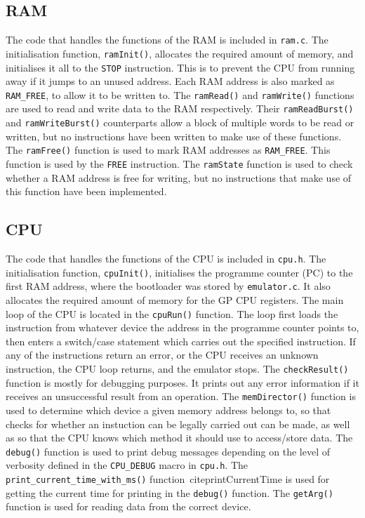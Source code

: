 \documentclass[a4paper,11pt]{article}
\begin{document}
    \subsection{RAM}
        The code that handles the functions of the RAM is included in \lstinline{ram.c}. The initialisation function, \lstinline{ramInit()}, allocates the required amount of memory, and initialises it all to the \lstinline{STOP} instruction. This is to prevent the CPU from running away if it jumps to an unused address. Each RAM address is also marked as \lstinline{RAM_FREE}, to allow it to be written to. The \lstinline{ramRead()} and \lstinline{ramWrite()} functions are used to read and write data to the RAM respectively. Their \lstinline{ramReadBurst()} and \lstinline{ramWriteBurst()} counterparts allow a block of multiple words to be read or written, but no instructions have been written to make use of these functions. The \lstinline{ramFree()} function is used to mark RAM addresses as \lstinline{RAM_FREE}. This function is used by the \lstinline{FREE} instruction. The \lstinline{ramState} function is used to check whether a RAM address is free for writing, but no instructions that make use of this function have been implemented.
    
    \subsection{CPU}
        The code that handles the functions of the CPU is included in \lstinline{cpu.h}. The initialisation function, \lstinline{cpuInit()}, initialises the programme counter (PC) to the first RAM address, where the bootloader was stored by \lstinline{emulator.c}. It also allocates the required amount of memory for the GP CPU registers. The main loop of the CPU is located in the \lstinline{cpuRun()} function. The loop first loads the instruction from whatever device the address in the programme counter points to, then enters a switch/case statement which carries out the specified instruction. If any of the instructions return an error, or the CPU receives an unknown instruction, the CPU loop returns, and the emulator stops. The \lstinline{checkResult()} function is mostly for debugging purposes. It prints out any error information if it receives an unsuccessful result from an operation. The \lstinline{memDirector()} function is used to determine which device a given memory address belongs to, so that checks for whether an instuction can be legally carried out can be made, as well as so that the CPU knows which method it should use to access/store data. The \lstinline{debug()} function is used to print debug messages depending on the level of verbosity defined in the \lstinline{CPU_DEBUG} macro in \lstinline{cpu.h}. The \lstinline{print_current_time_with_ms()} function~cite{printCurrentTime} is used for getting the current time for printing in the \lstinline{debug()} function. The \lstinline{getArg()} function is used for reading data from the correct device.
    
\end{document}
